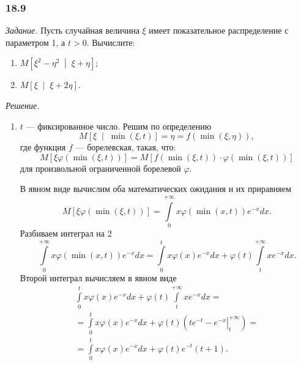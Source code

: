 \subsubsection*{18.9}

\textit{Задание.}
Пусть случайная величина $ \xi $ имеет показательное распределение с параметром 1, а $t > 0$.
Вычислите:
\begin{enumerate}[label=\alph*)]
  \item $M \left[ \xi^2 - \eta^2 \; \middle| \; \xi + \eta \right] $;
  \item $M \left[ \xi \; \middle| \; \xi + 2 \eta \right] $.
\end{enumerate}

\textit{Решение.}
\begin{enumerate}[label=\alph*)]
  \item $t$ --- фиксированное число.
  Решим по определению
  $$M \left[ \xi \; \middle| \; \min \left( \xi, t \right) \right] =
    \eta =
    f \left( \min \left( \xi, \eta \right) \right),$$
  где функция $f$ --- борелевская, такая, что:
  $$M \left[ \xi \varphi \left( \min \left( \xi, t \right) \right) \right] =
    M \left[ f \left( \min \left( \xi, t \right) \right) \cdot
    \varphi \left( \min \left( \xi, t \right) \right) \right] $$
  для произвольной ограниченной борелевой $ \varphi $.

  В явном виде вычислим оба математических ожидания и их приравняем
  $$M \left[ \xi \varphi \left( \min \left( \xi, t \right) \right) \right] =
    \int \limits_0^{+ \infty } x \varphi \left( \min \left( x, t \right) \right) e^{-x} dx.$$
  Разбиваем интеграл на 2
  $$ \int \limits_0^{+ \infty } x \varphi \left( \min \left( x, t \right) \right) e^{-x} dx =
    \int \limits_0^t x \varphi \left( x \right) e^{-x} dx +
    \varphi \left( t \right) \int \limits_t^{+ \infty } xe^{-x} dx.$$
  Второй интеграл вычисляем в явном виде
  \begin{equation*}
    \begin{split}
      \int \limits_0^t x \varphi \left( x \right) e^{-x} dx +
      \varphi \left( t \right) \int \limits_t^{+ \infty } xe^{-x} dx = \\
      = \int \limits_0^t x \varphi \left( x \right) e^{-x} dx +
      \varphi \left( t \right) \left( \left. te^{-t} - e^{-x} \right|_t^{+ \infty } \right) = \\
      = \int \limits_0^t x \varphi \left( x \right) e^{-x} dx +
      \varphi \left( t \right) e^{-t} \left( t + 1 \right).
    \end{split}
  \end{equation*}


\end{enumerate}
